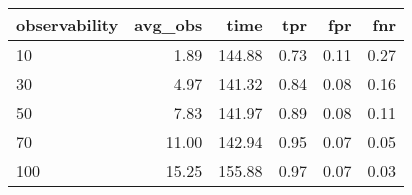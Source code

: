 \begin{tabular}{lrrrrr}
\toprule
observability &  avg\_obs &   time &  tpr &  fpr &  fnr \\
\midrule
           10 &     1.89 & 144.88 & 0.73 & 0.11 & 0.27 \\
           30 &     4.97 & 141.32 & 0.84 & 0.08 & 0.16 \\
           50 &     7.83 & 141.97 & 0.89 & 0.08 & 0.11 \\
           70 &    11.00 & 142.94 & 0.95 & 0.07 & 0.05 \\
          100 &    15.25 & 155.88 & 0.97 & 0.07 & 0.03 \\
\bottomrule
\end{tabular}
